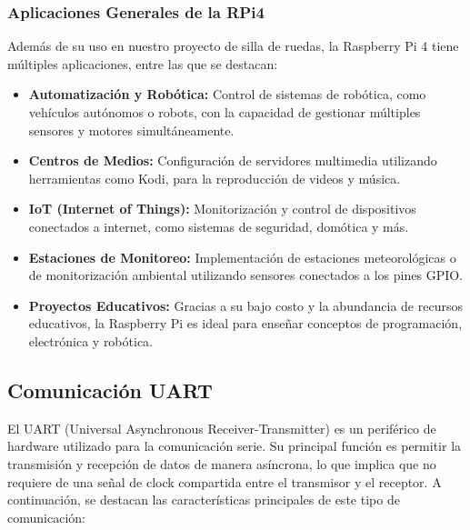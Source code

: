 \documentclass{article}
\begin{document}
\subsubsection{Aplicaciones Generales de la RPi4}
Además de su uso en nuestro proyecto de silla de ruedas, la Raspberry Pi 4 tiene múltiples aplicaciones, entre las que se destacan:

\begin{itemize}
    \item \textbf{Automatización y Robótica:} Control de sistemas de robótica, como vehículos autónomos o robots, con la capacidad de gestionar múltiples sensores y motores simultáneamente.
    \item \textbf{Centros de Medios:} Configuración de servidores multimedia utilizando herramientas como Kodi, para la reproducción de videos y música.
    \item \textbf{IoT (Internet of Things):} Monitorización y control de dispositivos conectados a internet, como sistemas de seguridad, domótica y más.
    \item \textbf{Estaciones de Monitoreo:} Implementación de estaciones meteorológicas o de monitorización ambiental utilizando sensores conectados a los pines GPIO.
    \item \textbf{Proyectos Educativos:} Gracias a su bajo costo y la abundancia de recursos educativos, la Raspberry Pi es ideal para enseñar conceptos de programación, electrónica y robótica.
\end{itemize}

\subsection{Comunicación UART}

El UART (Universal Asynchronous Receiver-Transmitter) es un periférico de hardware utilizado para la comunicación serie. Su principal función es permitir la transmisión y recepción de datos de manera asíncrona, lo que implica que no requiere de una señal de clock compartida entre el transmisor y el receptor. A continuación, se destacan las características principales de este tipo de comunicación:
\end{document}
